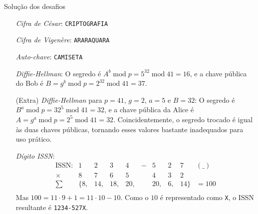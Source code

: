 \documentclass[utf8]{beamer}
\begin{document}
\begin{frame}{Solução dos desafios}
  \begin{itemize}
    \item[\checkmark] \emph{Cifra de César}: \texttt{CRIPTOGRAFIA}
    \item[\checkmark] \emph{Cifra de Vigenère}: \texttt{ARARAQUARA}
    \item[\checkmark] \emph{Auto-chave}: \texttt{CAMISETA}
    \item[\checkmark] \emph{Diffie-Hellman}:
    O segredo é
    $A^b\;\text{mod}\;p = 5^{32}\;\text{mod}\;41 = 16$, e
    a chave pública do Bob é
    $B = g^b\;\text{mod}\;p = 2^{32}\;\text{mod}\;41 = 37$.
    \item[(Extra)]
    \emph{Diffie-Hellman} para $p=41$, $g=2$, $a=5$ e $B=32$:
    O segredo é
    $B^a\;\text{mod}\;p = 32^5\;\text{mod}\;41 = 32$,
    e a chave pública da Alice é
    $A = g^a\;\text{mod}\;p = 2^5\;\text{mod}\;41 = 32$.
    Coincidentemente,
    o segredo trocado é igual às duas chaves públicas,
    tornando esses valores bastante inadequados para uso prático.
    \item[\checkmark] \emph{Dígito ISSN}:
    \[
    \begin{array}{rccccccccl}
      \text{ISSN:} &  1 &  2 &  3 &  4 & - &  5 &  2 &  7 & (\_) \\
            \times &  8 &  7 &  6 &  5 &   &  4 &  3 &  2 \\ \hline
            \sum & \{ 8,& 14,& 18,& 20,&   & 20,&  6,& 14 \} & = 100 \\
    \end{array}
    \]
    Mas $100 = 11 \cdot 9 + 1 = 11 \cdot 10 - 10$.
    Como o $10$ é representado como \texttt{X},
    o ISSN resultante é \texttt{1234-527X}.
  \end{itemize}
\end{frame}
\end{document}
